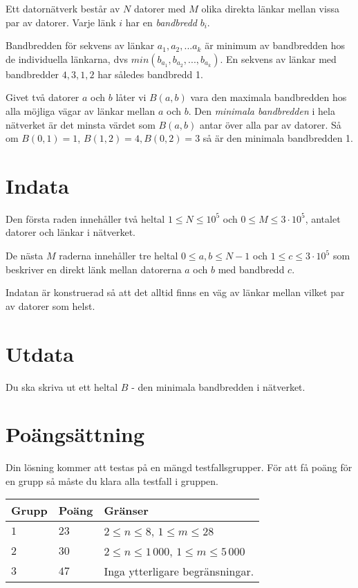 Ett datornätverk består av $N$ datorer med $M$ olika direkta länkar mellan vissa par av datorer. Varje länk $i$ har en \emph{bandbredd} $b_i$.

Bandbredden för sekvens av länkar $a_1, a_2, ... a_k$ är minimum av bandbredden hos de individuella länkarna, dvs $min(b_{a_1}, b_{a_2}, ..., b_{a_k})$. En sekvens av länkar med bandbredder $4, 3, 1, 2$ har således bandbredd 1.

Givet två datorer $a$ och $b$ låter vi $B(a, b)$ vara den maximala bandbredden hos alla möjliga vägar av länkar mellan $a$ och $b$. Den \emph{minimala bandbredden} i hela nätverket är det minsta värdet som $B(a, b)$ antar över alla par av datorer. Så om $B(0, 1) = 1$, $B(1, 2) = 4, B(0, 2) = 3$ så är den minimala bandbredden 1.

\section*{Indata}
Den första raden innehåller två heltal $1 \le N \le 10^5$ och $0 \le M \le 3 \cdot 10^5$, antalet datorer och länkar i nätverket. 

De nästa $M$ raderna innehåller tre heltal $0 \le a, b \le N - 1$ och $1 \le c \le 3 \cdot 10^5$ som beskriver en direkt länk mellan datorerna $a$ och $b$ med bandbredd $c$.

Indatan är konstruerad så att det alltid finns en väg av länkar mellan vilket par av datorer som helst.

\section*{Utdata}
Du ska skriva ut ett heltal $B$ - den minimala bandbredden i nätverket.

\section*{Poängsättning}
Din lösning kommer att testas på en mängd testfallsgrupper. För att få poäng
för en grupp så måste du klara alla testfall i gruppen.

\noindent
\begin{tabular}{| l | l | p{12cm} |}
  \hline
  \textbf{Grupp} & \textbf{Poäng} & \textbf{Gränser} \\ \hline
  $1$    & $23$      & $2 \le n \le 8$, $1 \le m \le 28$ \\ \hline
  $2$    & $30$      & $2 \le n \le 1\,000$, $1 \le m \le 5\,000$ \\ \hline
  $3$    & $47$      & Inga ytterligare begränsningar. \\ \hline
\end{tabular}

